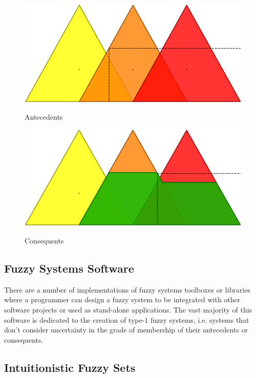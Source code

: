 \begin{figure}
\caption{Antecedents}
\centering
\includegraphics[width=1.0\textwidth]{img/antecedents.png}
\label{figure:antecedents}
\end{figure}

\begin{figure}
\caption{Consequents}
\centering
\includegraphics[width=1.0\textwidth]{img/consequents.png}
\label{figure:consequents}
\end{figure}

\subsection{Fuzzy Systems Software}
\label{subsection:fuzzy-systems-software}

There are a number of implementations of fuzzy systems toolboxes or libraries
where a programmer can design a fuzzy system to be integrated with other
software projects or used as stand-alone applications. The vast majority of this
software is dedicated to the creation of type-1 fuzzy systems, i.e. systems that
don't consider uncertainty in the grade of membership of their antecedents or
consequents.

\subsection{Intuitionistic Fuzzy Sets}
\label{subsection:intuitionistic-fuzzy-sets}

